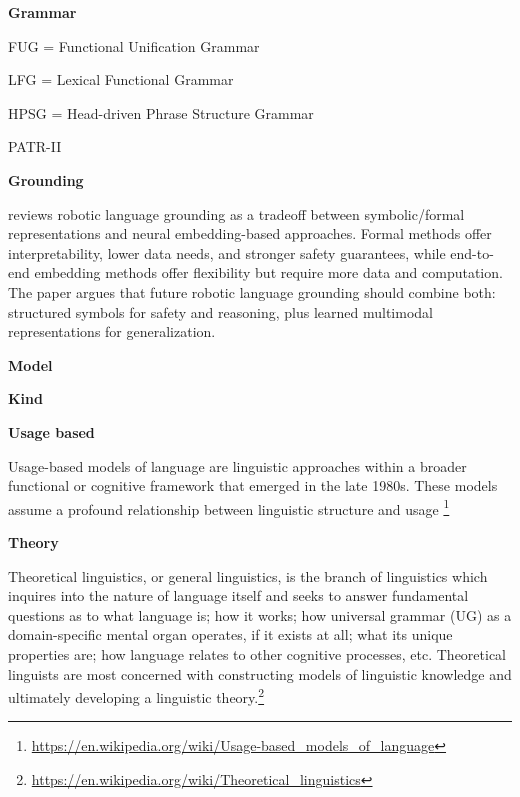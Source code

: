 \documentclass{book}
\providecommand{\ProjectDeepHeading}[2]{%
    \par\medskip\noindent\textbf{#2}\par\smallskip
}
\providecommand{\seeherefooter}[1]{\footnote{\url{#1}}}
\begin{document}
\ProjectDeepHeading{4}{Grammar}


FUG  = Functional Unification Grammar
    
    LFG  = Lexical Functional Grammar
    
    HPSG = Head-driven Phrase Structure Grammar
    
    PATR-II

\ProjectDeepHeading{4}{Grounding}


\cite{cohen-2024-a-survey-of-robotic-language-grounding-tradeoffs-between-symbols-and-embeddings} reviews robotic language grounding as a tradeoff between symbolic/formal representations and neural embedding-based approaches. Formal methods offer interpretability, lower data needs, and stronger safety guarantees, while end-to-end embedding methods offer flexibility but require more data and computation. The paper argues that future robotic language grounding should combine both: structured symbols for safety and reasoning, plus learned multimodal representations for generalization.

\ProjectDeepHeading{4}{Model}

\ProjectDeepHeading{5}{Kind}

\ProjectDeepHeading{6}{Usage based}


Usage-based models of language are linguistic approaches within a broader functional or cognitive framework that emerged in the late 1980s. These models assume a profound relationship between linguistic structure and usage \seeherefooter{https://en.wikipedia.org/wiki/Usage-based_models_of_language}

\ProjectDeepHeading{4}{Theory}


Theoretical linguistics, or general linguistics, is the branch of linguistics which inquires into the nature of language itself and seeks to answer fundamental questions as to what language is; how it works; how universal grammar (UG) as a domain-specific mental organ operates, if it exists at all; what its unique properties are; how language relates to other cognitive processes, etc. Theoretical linguists are most concerned with constructing models of linguistic knowledge and ultimately developing a linguistic theory.\seeherefooter{https://en.wikipedia.org/wiki/Theoretical_linguistics}
\end{document}

